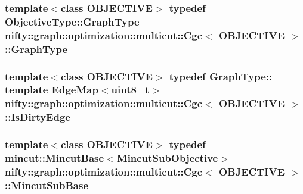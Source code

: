 \subsubsection[{Graph\+Type}]{\setlength{\rightskip}{0pt plus 5cm}template$<$class O\+B\+J\+E\+C\+T\+I\+V\+E$>$ typedef Objective\+Type\+::\+Graph\+Type {\bf nifty\+::graph\+::optimization\+::multicut\+::\+Cgc}$<$ O\+B\+J\+E\+C\+T\+I\+V\+E $>$\+::{\bf Graph\+Type}}\label{classnifty_1_1graph_1_1optimization_1_1multicut_1_1Cgc_a7954c621d6b0085dac0a0208e8edeb98}
\hypertarget{classnifty_1_1graph_1_1optimization_1_1multicut_1_1Cgc_a9aab1ca56069c4f2801a35bf05620465}{}
\subsubsection[{Is\+Dirty\+Edge}]{\setlength{\rightskip}{0pt plus 5cm}template$<$class O\+B\+J\+E\+C\+T\+I\+V\+E$>$ typedef Graph\+Type\+:: template Edge\+Map$<$uint8\+\_\+t$>$ {\bf nifty\+::graph\+::optimization\+::multicut\+::\+Cgc}$<$ O\+B\+J\+E\+C\+T\+I\+V\+E $>$\+::{\bf Is\+Dirty\+Edge}}\label{classnifty_1_1graph_1_1optimization_1_1multicut_1_1Cgc_a9aab1ca56069c4f2801a35bf05620465}
\hypertarget{classnifty_1_1graph_1_1optimization_1_1multicut_1_1Cgc_aa4e8e89c78edc941bdb1b9331c81395d}{}
\subsubsection[{Mincut\+Sub\+Base}]{\setlength{\rightskip}{0pt plus 5cm}template$<$class O\+B\+J\+E\+C\+T\+I\+V\+E$>$ typedef {\bf mincut\+::\+Mincut\+Base}$<${\bf Mincut\+Sub\+Objective}$>$ {\bf nifty\+::graph\+::optimization\+::multicut\+::\+Cgc}$<$ O\+B\+J\+E\+C\+T\+I\+V\+E $>$\+::{\bf Mincut\+Sub\+Base}}\label{classnifty_1_1graph_1_1optimization_1_1multicut_1_1Cgc_aa4e8e89c78edc941bdb1b9331c81395d}
\hypertarget{classnifty_1_1graph_1_1optimization_1_1multicut_1_1Cgc_a104f55e83ebbaf6451d0260210f0c7dc}{}
